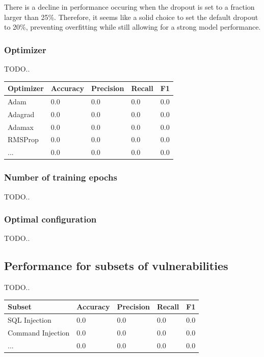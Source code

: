 \documentclass[
	a4paper,
	pagesize,
	pdftex,
	12pt,
	twoside, %
	BCOR=5mm, %
	ngerman,
	fleqn,
	final,
	]{scrartcl}
\begin{document}
There is a decline in performance occuring when the dropout is set to a fraction larger than 25\%. Therefore, it seems like a solid choice to set the default dropout to 20\%, preventing overfitting while still allowing for a strong model performance.



\subsubsection{Optimizer}

TODO..

\begin{tabular}{ | p{2cm} || p{2cm}|p{2cm}|p{2cm}|p{2cm}|  }
	\hline
	Optimizer & Accuracy & Precision & Recall & F1 \\
	\hline
	Adam & 0.0 &  0.0 &  0.0 &  0.0 \\
	Adagrad & 0.0 &  0.0 &  0.0 &  0.0 \\
	Adamax & 0.0 &  0.0 &  0.0 &  0.0 \\
	RMSProp & 0.0 &  0.0 &  0.0 &  0.0 \\
	... & 0.0 &  0.0 &  0.0 &  0.0 \\
	\hline
	\hline
\end{tabular}


\subsubsection{Number of training epochs}

TODO..

\subsubsection{Optimal configuration}


TODO..






\subsection{Performance for subsets of vulnerabilities}


TODO..

\begin{tabular}{ | p{5cm} || p{2cm}|p{2cm}|p{2cm}|p{2cm}|  }
	\hline
	Subset & Accuracy & Precision & Recall & F1 \\
	\hline
	SQL Injection & 0.0 &  0.0 &  0.0 &  0.0 \\
	Command Injection & 0.0 &  0.0 &  0.0 &  0.0 \\
	... & 0.0 &  0.0 &  0.0 &  0.0 \\
	\hline
	\hline
\end{tabular}
\end{document}
